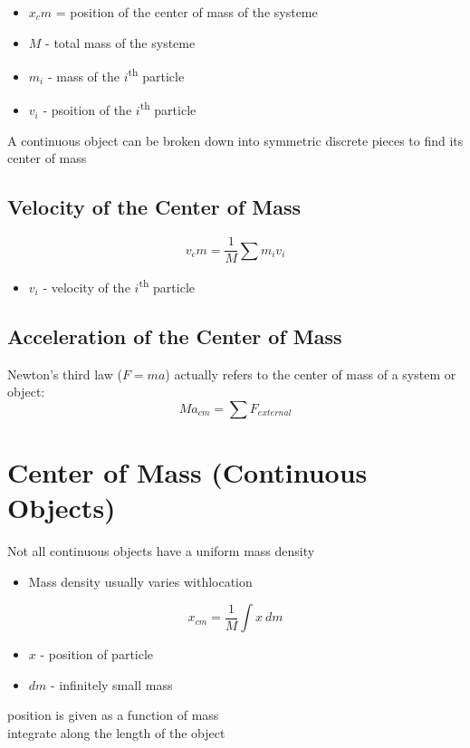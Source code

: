 \documentclass[titlepage]{article}
\begin{document}
\begin{itemize}
    \item $x_cm$ = position of the center of mass of the systeme
    \item $M$ - total mass of the systeme
    \item $m_i$ - mass of the $i$\textsuperscript{th} particle
    \item $v_i$ - psoition of the $i$\textsuperscript{th} particle
\end{itemize}

A continuous object can be broken down into symmetric discrete pieces to find its center of mass

\subsection{Velocity of the Center of Mass}
\[v_cm = \frac{1}{M}\sum m_i v_i\]

\begin{itemize}
    \item $v_i$ - velocity of the $i$\textsuperscript{th} particle
\end{itemize}

\subsection{Acceleration of the Center of Mass}
Newton's third law ($F = ma$) actually refers to the center of mass of a system or object:
\[Ma_{cm} = \sum F_{external}\]

\section{Center of Mass (Continuous Objects)}
Not all continuous objects have a uniform mass density
\begin{itemize}
    \item Mass density usually varies withlocation
\end{itemize}

\[x_{cm} = \frac{1}{M} \int x \ dm\]
\begin{itemize}
    \item $x$ - position of particle
    \item $dm$ - infinitely small mass
\end{itemize}
position is given as a function of mass\\
integrate along the length of the object
\end{document}
